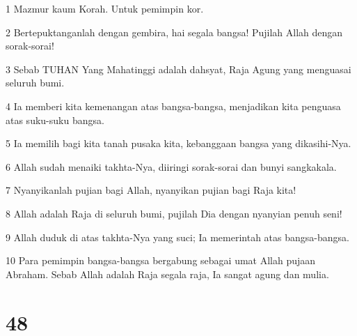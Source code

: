 \par 1 Mazmur kaum Korah. Untuk pemimpin kor.
\par 2 Bertepuktanganlah dengan gembira, hai segala bangsa! Pujilah Allah dengan sorak-sorai!
\par 3 Sebab TUHAN Yang Mahatinggi adalah dahsyat, Raja Agung yang menguasai seluruh bumi.
\par 4 Ia memberi kita kemenangan atas bangsa-bangsa, menjadikan kita penguasa atas suku-suku bangsa.
\par 5 Ia memilih bagi kita tanah pusaka kita, kebanggaan bangsa yang dikasihi-Nya.
\par 6 Allah sudah menaiki takhta-Nya, diiringi sorak-sorai dan bunyi sangkakala.
\par 7 Nyanyikanlah pujian bagi Allah, nyanyikan pujian bagi Raja kita!
\par 8 Allah adalah Raja di seluruh bumi, pujilah Dia dengan nyanyian penuh seni!
\par 9 Allah duduk di atas takhta-Nya yang suci; Ia memerintah atas bangsa-bangsa.
\par 10 Para pemimpin bangsa-bangsa bergabung sebagai umat Allah pujaan Abraham. Sebab Allah adalah Raja segala raja, Ia sangat agung dan mulia.

\chapter{48}

